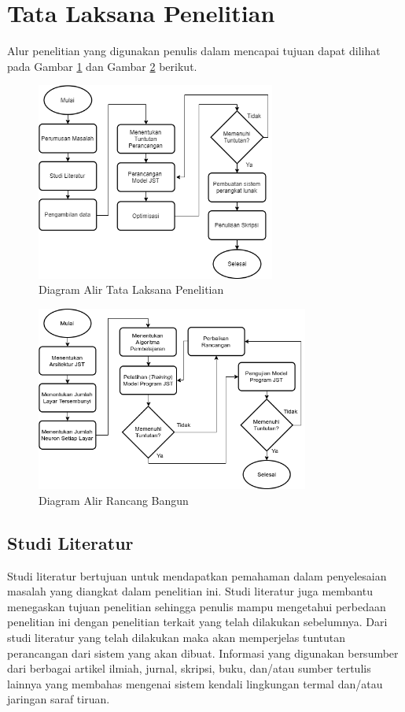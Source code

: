\section{Tata Laksana Penelitian}
Alur penelitian yang digunakan penulis dalam mencapai tujuan dapat dilihat pada Gambar \ref{fig:4:TataLaksanaPenelitian} dan Gambar \ref{fig:4:DiagramRancangBangun} berikut.
\begin{figure}[!h]
	\centering
	\includegraphics[width=0.7\textwidth]{figures/AlurPenelitian}
	\caption{Diagram Alir Tata Laksana Penelitian}
	\label{fig:4:TataLaksanaPenelitian}
\end{figure}
\begin{figure}[!h]
	\centering
	\includegraphics[width=0.8\textwidth]{figures/TataLaksanaRancangBangun}
	\caption{Diagram Alir Rancang Bangun}
	\label{fig:4:DiagramRancangBangun}
\end{figure}

\subsection{Studi Literatur}
Studi literatur bertujuan untuk mendapatkan pemahaman dalam penyelesaian masalah yang diangkat dalam penelitian ini. Studi literatur juga membantu menegaskan tujuan penelitian sehingga penulis mampu mengetahui perbedaan penelitian ini dengan penelitian terkait yang telah dilakukan sebelumnya. Dari studi literatur yang telah dilakukan maka akan memperjelas tuntutan perancangan dari sistem yang akan dibuat. Informasi yang digunakan bersumber dari berbagai artikel ilmiah, jurnal, skripsi, buku, dan/atau sumber tertulis lainnya yang membahas mengenai sistem kendali lingkungan termal dan/atau jaringan saraf tiruan.

